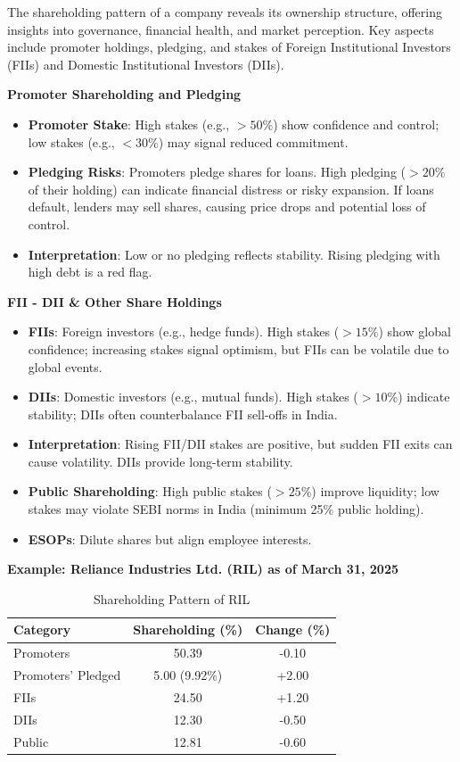\documentclass[12pt]{article}
\begin{document}
The shareholding pattern of a company reveals its ownership structure, offering insights into governance, financial health, and market perception. Key aspects include promoter holdings, pledging, and stakes of Foreign Institutional Investors (FIIs) and Domestic Institutional Investors (DIIs).

\textbf{Promoter Shareholding and Pledging}
\begin{itemize}
\item \textbf{Promoter Stake}: High stakes (e.g., $>50\%$) show confidence and control; low stakes (e.g., $<30\%$) may signal reduced commitment.
\item \textbf{Pledging Risks}: Promoters pledge shares for loans. High pledging ($>20\%$ of their holding) can indicate financial distress or risky expansion. If loans default, lenders may sell shares, causing price drops and potential loss of control.
\item \textbf{Interpretation}: Low or no pledging reflects stability. Rising pledging with high debt is a red flag.
\end{itemize}

\textbf{FII - DII \& Other Share Holdings}
\begin{itemize}
\item \textbf{FIIs}: Foreign investors (e.g., hedge funds). High stakes ($>15\%$) show global confidence; increasing stakes signal optimism, but FIIs can be volatile due to global events.
\item \textbf{DIIs}: Domestic investors (e.g., mutual funds). High stakes ($>10\%$) indicate stability; DIIs often counterbalance FII sell-offs in India.
\item \textbf{Interpretation}: Rising FII/DII stakes are positive, but sudden FII exits can cause volatility. DIIs provide long-term stability.
\item \textbf{Public Shareholding}: High public stakes ($>25\%$) improve liquidity; low stakes may violate SEBI norms in India (minimum 25\% public holding).
\item \textbf{ESOPs}: Dilute shares but align employee interests.
\end{itemize}

\textbf{Example: Reliance Industries Ltd. (RIL) as of March 31, 2025}
\begin{table}[h]
\centering
\caption{Shareholding Pattern of RIL}
\begin{tabular}{|l|c|c|}
\hline
\textbf{Category} & \textbf{Shareholding (\%)} & \textbf{Change (\%)} \\
\hline
Promoters & 50.39 & -0.10 \\
Promoters' Pledged & 5.00 (9.92\%) & +2.00 \\
FIIs & 24.50 & +1.20 \\
DIIs & 12.30 & -0.50 \\
Public & 12.81 & -0.60 \\
\hline
\end{tabular}
\end{table}
\end{document}
